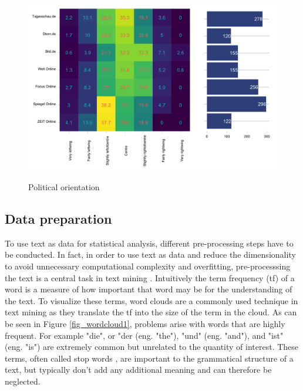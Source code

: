 \documentclass[12pt,a4paper,notitlepage]{article}
\begin{document}
\begin{figure}[H]
\begin{center}
	\caption{Political orientation }
	\includegraphics[width=.9\textwidth]{../figs/reuters3}
	\label{fig_reuters3}
	\end{center}
\end{figure}

\subsection{Data preparation}

To use text as data for statistical analysis, different pre-processing steps have to be conducted. In fact, in order to use text as data and reduce the dimensionality to avoid unnecessary computational complexity and overfitting, pre-processsing the text is a central task in text mining \citep{gentzkow_text_2017, bholat_text_2015}. Intuitively the term frequency (tf) of a word is a measure of how important that word may be for the understanding of the text. To visualize these terms, word clouds are a commonly used technique in text mining as they translate the tf into the size of the term in the cloud. As can be seen in Figure \ref{fig_wordcloud1}, problems arise with words that are highly frequent. For example "die", or "der (eng. "the"), "und" (eng. "and"), and "ist" (eng. "is") are extremely common but unrelated to the quantity of interest. These terms, often called stop words \citep{gentzkow_text_2017}, are important to the grammatical structure of a text, but typically don't add any additional meaning and can therefore be neglected. 
\end{document}
